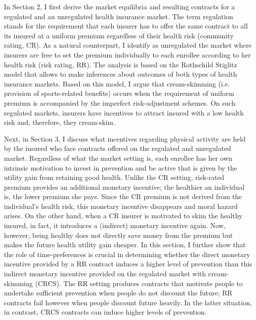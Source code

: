\documentclass[12pt,english]{article}%
\makeatletter
\renewcommand{\subsection}{\@startsection{subsection}{2}{0mm}{-0.1\baselineskip}{0.5\baselineskip}{\normalfont\bf\flushleft}}
\makeatother
\begin{document}
\subsection{Structure of the thesis} 
In Section 2, I first derive the market equilibria and resulting contracts for a regulated and an unregulated health insurance market. The term regulation stands for the requirement that each insurer has to offer the same contract to all its insured at a uniform premium regardless of their health risk (community rating, CR). As a natural counterpart, I identify as unregulated the market where insurers are free to set the premium individually to each enrollee according to her health risk (risk rating, RR). The analysis is based on the Rothschild Stiglitz model \citep{rotschild1976} that allows to make inferences about outcomes of both types of health insurance markets. Based on this model, I argue that cream-skimming (i.e. provision of sports-related benefits) occurs when the requirement of uniform premium is accompanied by the imperfect risk-adjustment schemes. On such regulated markets, insurers have incentives to attract insured with a low health risk and, therefore, they cream-skim.

Next, in Section 3, I discuss what incentives regarding  physical activity are held by the insured who face contracts offered on the regulated and unregulated market. Regardless of what the market setting is, each enrollee has her own intrinsic motivation to invest in prevention and be active that is given by the utility gain from retaining good health. Unlike the CR setting, risk-rated premium provides an additional monetary incentive; the healthier an individual is, the lower premium she pays. Since the CR premium is not derived from the individual's health risk, this monetary incentive disappears and moral hazard arises. On the other hand, when a CR insurer is motivated to skim the healthy insured, in fact, it introduces a (indirect) monetary incentive again. Now, however, being healthy does not directly save money from the premium but makes the future health utility gain cheaper. In this section, I further show that the role of time-preferences is crucial in determining whether the direct monetary incentive provided by a RR contract induces a higher level of prevention than this indirect monetary incentive provided on the regulated market with cream-skimming (CRCS). The RR setting produces contracts that motivate people to undertake sufficient prevention when people do not discount the future; RR contracts fail however when people discount future heavily. In the latter situation, in contrast, CRCS contracts can induce higher levels of prevention.
 
\end{document}
